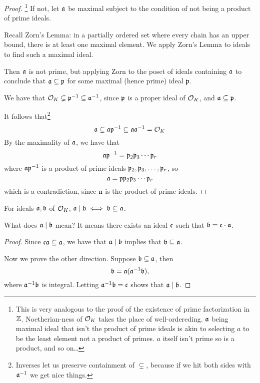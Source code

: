 \begin{proof}\footnote{This is very analogous to the proof of the existence of prime factorization in $\mathbb Z$. Noetherian-ness of $\mathcal{O}_K$ takes the place of well-ordereding. $\mathfrak{a}$ being maximal ideal that isn't the product of prime ideals is akin to selecting $a$ to be the least element not a product of primes. $a$ itself isn't prime so is a product, and so on\dots}
    If not, let $\mathfrak{a}$ be maximal subject to the condition of not being a product of prime ideals.
    \begin{remark*}
        Recall Zorn's Lemma: in a partially ordered set where every chain has an upper bound, there is at least one maximal element. We apply Zorn's Lemma to ideals to find such a maximal ideal.
    \end{remark*}
    Then $\mathfrak{a}$ is not prime, but applying Zorn to the poset of ideals containing $\mathfrak{a}$ to conclude that $\mathfrak{a}\subseteq \mathfrak{p}$ for some maximal (hence prime) ideal $\mathfrak{p}$.

    We have that $\mathcal{O}_K\subsetneq \mathfrak{p}^{-1}\subseteq \mathfrak{a}^{-1}$, since $\mathfrak{p}$ is a proper ideal of $\mathcal{O}_K$, and $\mathfrak{a}\subseteq\mathfrak{p}$.

    It follows that\footnote{Inverses let us preserve containment of $\subsetneq$, because if we hit both sides with $\mathfrak{a}^{-1}$ we get nice things.}
    \[\mathfrak{a}\subsetneq \mathfrak{a}\mathfrak{p}^{-1}\subseteq \mathfrak{a}\mathfrak{a}^{-1} = \mathcal{O}_K\]
    By the maximality of $\mathfrak{a}$, we have that
    \[\mathfrak{a}\mathfrak{p}^{-1} = \mathfrak{p}_2\mathfrak{p}_3\cdots \mathfrak{p}_r\]
    where $\mathfrak{a}\mathfrak{p}^{-1}$ is a product of prime ideals $\mathfrak{p}_2, \mathfrak{p}_3, \dots, \mathfrak{p}_r$, so
    \[\mathfrak{a} = \mathfrak{p}\mathfrak{p}_2\mathfrak{p}_3\cdots \mathfrak{p}_r\]
    which is a contradiction, since $\mathfrak{a}$ is the product of prime ideals.
\end{proof}

\begin{lemma}
    For ideals $\mathfrak{a}, \mathfrak{b}$ of $\mathcal{O}_K$, $\mathfrak{a}\mid\mathfrak{b} \iff \mathfrak{b}\subseteq \mathfrak{a}$.
    \begin{ques*}
        What does $\mathfrak{a}\mid \mathfrak{b}$ mean? It means there exists an ideal $\mathfrak{c}$ such that $\mathfrak{b} = \mathfrak{c}\cdot \mathfrak{a}$.
    \end{ques*}
\end{lemma}
\begin{proof}
    Since $\mathfrak{c}\mathfrak{a}\subseteq \mathfrak{a}$, we have that $\mathfrak{a}\mid \mathfrak{b}$ implies that $\mathfrak{b}\subseteq \mathfrak{a}$.

    Now we prove the other direction. Suppose $\mathfrak{b}\subseteq\mathfrak{a}$, then
    \[\mathfrak{b} = \mathfrak{a}(\mathfrak{a}^{-1}\mathfrak{b}),\]
    where $\mathfrak{a}^{-1}\mathfrak{b}$ is integral. Letting $\mathfrak{a}^{-1}\mathfrak{b} = \mathfrak{c}$ shows that $\mathfrak{a}\mid\mathfrak{b}$.
\end{proof}

